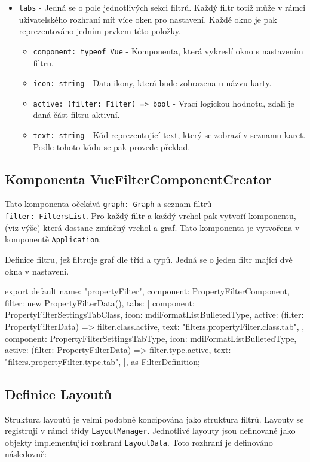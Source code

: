 \begin{itemize}
  \item \texttt{tabs} - Jedná se o pole jednotlivých sekci filtrů. Každý filtr totiž může v rámci uživatelského rozhraní mít více oken pro nastavení. Každé okno je pak reprezentováno jedním prvkem této položky.
  \begin{itemize}
    \item \texttt{component: typeof Vue} - Komponenta, která vykreslí okno s nastavením filtru.
    \item \texttt{icon: string} - Data ikony, která bude zobrazena u názvu karty.
    \item \texttt{active: (filter: Filter) => bool} - Vrací logickou hodnotu, zdali je daná část filtru aktivní.
    \item \texttt{text: string} - Kód reprezentující text, který se zobrazí v seznamu karet. Podle tohoto kódu se pak provede překlad.
  \end{itemize}

\end{itemize}

\subsection*{Komponenta VueFilterComponentCreator}
Tato komponenta očekává \texttt{graph: Graph} a seznam filtrů \\\texttt{filter: FiltersList}. Pro každý filtr a každý vrchol pak vytvoří komponentu, (viz výše) která dostane zmíněný vrchol a graf. Tato komponenta je vytvořena v komponentě \texttt{Application}.

\begin{prikl}
Definice filtru, jež filtruje graf dle tříd a typů. Jedná se o jeden filtr mající dvě okna v nastavení.
\begin{code}
export default {
    name: "propertyFilter",
    component: PropertyFilterComponent,
    filter: new PropertyFilterData(),
    tabs: [{
        component: PropertyFilterSettingsTabClass,
        icon: mdiFormatListBulletedType,
        active: (filter: PropertyFilterData) => filter.class.active,
        text: "filters.propertyFilter.class.tab",
    }, {
        component: PropertyFilterSettingsTabType,
        icon: mdiFormatListBulletedType,
        active: (filter: PropertyFilterData) => filter.type.active,
        text: "filters.propertyFilter.type.tab",
    }],
} as FilterDefinition;
\end{code}
\end{prikl}


\subsection{Definice Layoutů}
Struktura layoutů je velmi podobně koncipována jako struktura filtrů. Layouty se registrují v rámci třídy \texttt{LayoutManager}. Jednotlivé layouty jsou definované jako objekty implementující rozhraní \texttt{LayoutData}. Toto rozhraní je definováno následovně:

